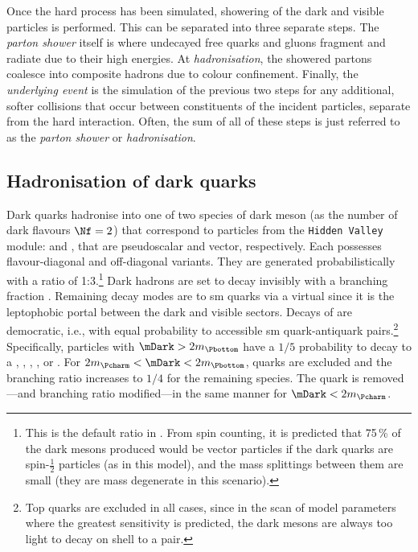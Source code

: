 Once the hard process has been simulated, showering of the dark and visible particles is performed. This can be separated into three separate steps. The \emph{parton shower} itself is where undecayed free quarks and gluons fragment and radiate due to their high energies. At \emph{hadronisation}, the showered partons coalesce into composite hadrons due to colour confinement. Finally, the \emph{underlying event} is the simulation of the previous two steps for any additional, softer collisions that occur between constituents of the incident particles, separate from the hard interaction. Often, the sum of all of these steps is just referred to as the \emph{parton shower} or \emph{hadronisation}.




\subsection{Hadronisation of dark quarks}
\label{subsec:svj_dark_hadronisation}

Dark quarks hadronise into one of two species of dark meson (as the number of dark flavours $\Nf = \text{2}$) that correspond to particles from the \texttt{Hidden Valley} module: \Ppidark and \Prhodark, that are pseudoscalar and vector, respectively. Each possesses flavour-diagonal and off-diagonal variants. They are generated probabilistically with a ratio of 1:3.\footnote{This is the default ratio in \PYTHIA. From spin counting, it is predicted that 75\,\% of the dark mesons produced would be vector particles if the dark quarks are spin-$\frac{1}{2}$ particles (as in this model), and the mass splittings between them are small (they are mass degenerate in this scenario).} Dark hadrons are set to decay invisibly with a branching fraction \rinv. Remaining decay modes are to \acrshort{sm} quarks via a virtual \PZprime since it is the leptophobic portal between the dark and visible sectors. Decays of \Prhodark are democratic, i.e., with equal probability to accessible \acrshort{sm} quark-antiquark pairs.\footnote{Top quarks are excluded in all cases, since in the scan of model parameters where the greatest sensitivity is predicted, the dark mesons are always too light to decay on shell to a \ttbar pair.} Specifically, \Prhodark particles with $\mDark > \text{2}m_{\Pbottom}$ have a $\text{1}/\text{5}$ probability to decay to a \Pup, \Pdown, \Pcharm, \Pstrange, or \Pbottom. For $\text{2}m_{\Pcharm} < \mDark < \text{2}m_{\Pbottom}$, \Pbottom quarks are excluded and the branching ratio increases to $\text{1}/\text{4}$ for the remaining species. The \Pcharm quark is removed---and branching ratio modified---in the same manner for $\mDark < \text{2}m_{\Pcharm}$.

